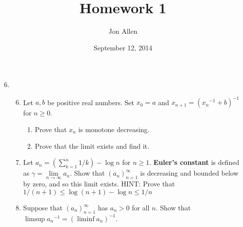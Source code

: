 \documentclass[letterpaper]{article}
\begin{document}
\title{Homework 1}
\date{September 12, 2014}
\author{Jon Allen}
\maketitle
\renewcommand{\labelenumi}{2.\arabic{enumi}}
\renewcommand{\labelenumii}{\Alph{enumii}.}
\renewcommand{\labelenumiii}{(\alph{enumiii})}
\begin{enumerate}
\setcounter{enumi}{5}
\item
  \begin{enumerate}
  \setcounter{enumii}{5}
  \item
  Let $a,b$ be positive real numbers. Set $x_0=a$ and $x_{n+1}=({x_n}^{-1}+b)^{-1}$ for $n\ge0$.
    \begin{enumerate}
    \item
    Prove that $x_n$ is monotone decreasing.
    \item
    Prove that the limit exists and find it.
    \end{enumerate}
  \item
  Let $a_n=(\sum_{k=1}^n{1/k})-\log n$ for $n\ge 1$. {\bfseries Euler's constant} is defined as $\gamma=\lim\limits_{n\to\infty}a_n$. Show that $(a_n)_{n=1}^\infty$ is decreasing and bounded below by zero, and so this limit exists. \uppercase{Hint}: Prove that $1/(n+1)\le\log(n+1)-\log n\le1/n$
  \setcounter{enumii}{12}
  \item
  Suppose that $(a_n)_{n=1}^\infty$ has $a_n>0$ for all $n$. Show that $\limsup {a_n}^{-1}=(\liminf a_n)^{-1}$.
  \end{enumerate}
\end{enumerate}
\end{document}
